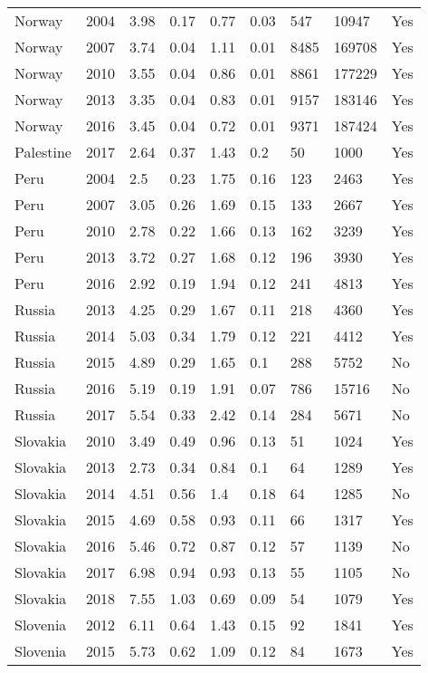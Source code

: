 \begin{tabular}{lllllllll}
Norway & 2004 & 3.98 & 0.17 & 0.77 & 0.03 & 547 & 10947 & Yes \\ 
Norway & 2007 & 3.74 & 0.04 & 1.11 & 0.01 & 8485 & 169708 & Yes \\ 
Norway & 2010 & 3.55 & 0.04 & 0.86 & 0.01 & 8861 & 177229 & Yes \\ 
Norway & 2013 & 3.35 & 0.04 & 0.83 & 0.01 & 9157 & 183146 & Yes \\ 
Norway & 2016 & 3.45 & 0.04 & 0.72 & 0.01 & 9371 & 187424 & Yes \\ 
Palestine & 2017 & 2.64 & 0.37 & 1.43 & 0.2 & 50 & 1000 & Yes \\ 
Peru & 2004 & 2.5 & 0.23 & 1.75 & 0.16 & 123 & 2463 & Yes \\ 
Peru & 2007 & 3.05 & 0.26 & 1.69 & 0.15 & 133 & 2667 & Yes \\ 
Peru & 2010 & 2.78 & 0.22 & 1.66 & 0.13 & 162 & 3239 & Yes \\ 
Peru & 2013 & 3.72 & 0.27 & 1.68 & 0.12 & 196 & 3930 & Yes \\ 
Peru & 2016 & 2.92 & 0.19 & 1.94 & 0.12 & 241 & 4813 & Yes \\ 
Russia & 2013 & 4.25 & 0.29 & 1.67 & 0.11 & 218 & 4360 & Yes \\ 
Russia & 2014 & 5.03 & 0.34 & 1.79 & 0.12 & 221 & 4412 & Yes \\ 
Russia & 2015 & 4.89 & 0.29 & 1.65 & 0.1 & 288 & 5752 & No \\ 
Russia & 2016 & 5.19 & 0.19 & 1.91 & 0.07 & 786 & 15716 & No \\ 
Russia & 2017 & 5.54 & 0.33 & 2.42 & 0.14 & 284 & 5671 & No \\ 
Slovakia & 2010 & 3.49 & 0.49 & 0.96 & 0.13 & 51 & 1024 & Yes \\ 
Slovakia & 2013 & 2.73 & 0.34 & 0.84 & 0.1 & 64 & 1289 & Yes \\ 
Slovakia & 2014 & 4.51 & 0.56 & 1.4 & 0.18 & 64 & 1285 & No \\ 
Slovakia & 2015 & 4.69 & 0.58 & 0.93 & 0.11 & 66 & 1317 & Yes \\ 
Slovakia & 2016 & 5.46 & 0.72 & 0.87 & 0.12 & 57 & 1139 & No \\ 
Slovakia & 2017 & 6.98 & 0.94 & 0.93 & 0.13 & 55 & 1105 & No \\ 
Slovakia & 2018 & 7.55 & 1.03 & 0.69 & 0.09 & 54 & 1079 & Yes \\ 
Slovenia & 2012 & 6.11 & 0.64 & 1.43 & 0.15 & 92 & 1841 & Yes \\ 
Slovenia & 2015 & 5.73 & 0.62 & 1.09 & 0.12 & 84 & 1673 & Yes \\ 

\end{tabular}
